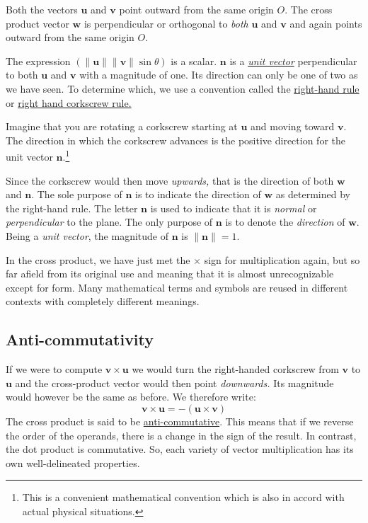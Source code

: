 \documentclass[
  a4paper,
]{article}
\begin{document}
Both the vectors \(\mathbf{u}\) and \(\mathbf{v}\) point outward from
the same origin \(O\). The cross product vector \(\mathbf{w}\) is
perpendicular or orthogonal to \emph{both} \(\mathbf{u}\) and
\(\mathbf{v}\) and again points outward from the same origin \(O\).

The expression
\((\lVert\mathbf{u}\rVert \lVert\mathbf{v}\rVert \sin \theta)\) is a
scalar. \(\mathbf{n}\) is a
\href{http://mathworld.wolfram.com/UnitVector.html}{\emph{unit vector}}
perpendicular to both \(\mathbf{u}\) and \(\mathbf{v}\) with a magnitude
of one. Its direction can only be one of two as we have seen. To
determine which, we use a convention called the
\href{http://mathworld.wolfram.com/Right-HandRule.html}{right-hand rule}
or \href{http://en.wikipedia.org/wiki/Right-hand_rule}{right hand
corkscrew rule.}

Imagine that you are rotating a corkscrew starting at \(\mathbf{u}\) and
moving toward \(\mathbf{v}\). The direction in which the corkscrew
advances is the positive direction for the unit vector
\(\mathbf{n}\).\footnote{This is a convenient mathematical convention
  which is also in accord with actual physical situations.}

Since the corkscrew would then move \emph{upwards,} that is the
direction of both \(\mathbf{w}\) and \(\mathbf{n}\). The sole purpose of
\(\mathbf{n}\) is to indicate the direction of \(\mathbf{w}\) as
determined by the right-hand rule. The letter \(\mathbf{n}\) is used to
indicate that it is \emph{normal} or \emph{perpendicular} to the plane.
The only purpose of \(\mathbf{n}\) is to denote the \emph{direction} of
\(\mathbf{w}\). Being a \emph{unit vector}, the magnitude of
\(\mathbf{n}\) is \(\lVert\mathbf n\rVert = 1\).

In the cross product, we have just met the \(\times\) sign for
multiplication again, but so far afield from its original use and
meaning that it is almost unrecognizable except for form. Many
mathematical terms and symbols are reused in different contexts with
completely different meanings.

\hypertarget{anti-commutativity}{%
\subsection{Anti-commutativity}\label{anti-commutativity}}

If we were to compute \(\mathbf{v} \times \mathbf{u}\) we would turn the
right-handed corkscrew from \(\mathbf{v}\) to \(\mathbf{u}\) and the
cross-product vector would then point \emph{downwards.} Its magnitude
would however be the same as before. We therefore write: \[
\mathbf{v} \times \mathbf{u} = - (\mathbf{u} \times \mathbf{v})
\] The cross product is said to be
\href{https://mathworld.wolfram.com/Anticommutative.html}{anti-commutative}.
This means that if we reverse the order of the operands, there is a
change in the sign of the result. In contrast, the dot product is
commutative. So, each variety of vector multiplication has its own
well-delineated properties.
\end{document}
